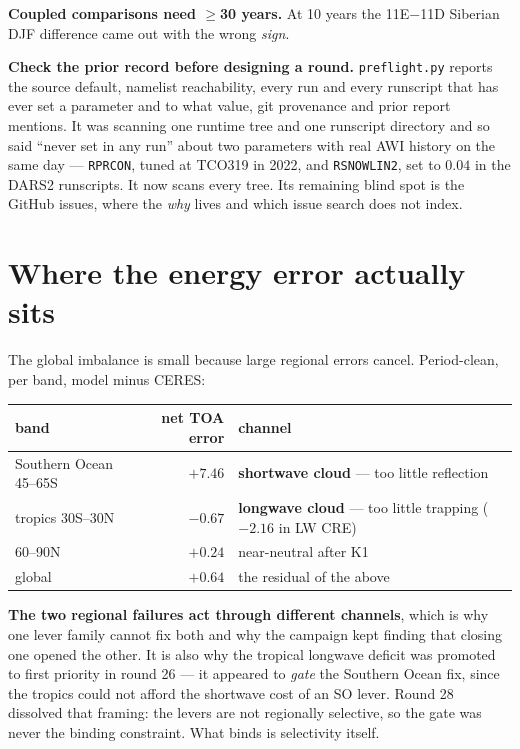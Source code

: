 \documentclass[10pt]{article}
\begin{document}
\textbf{Coupled comparisons need $\geq$30 years.} At 10 years the 11E$-$11D Siberian DJF
difference came out with the wrong \emph{sign}.

\textbf{Check the prior record before designing a round.} \texttt{preflight.py} reports the
source default, namelist reachability, every run and every runscript that has ever set a
parameter and to what value, git provenance and prior report mentions. It was scanning one
runtime tree and one runscript directory and so said ``never set in any run'' about two
parameters with real AWI history on the same day --- \texttt{RPRCON}, tuned at TCO319 in
2022, and \texttt{RSNOWLIN2}, set to $0.04$ in the DARS2 runscripts. It now scans every
tree. Its remaining blind spot is the GitHub issues, where the \emph{why} lives and which
issue search does not index.

\section{Where the energy error actually sits}\label{sec:decomp}

The global imbalance is small because large regional errors cancel. Period-clean, per band,
model minus CERES:

\begin{center}\footnotesize
\begin{tabular}{l r l}
\toprule
band & net TOA error & channel \\
\midrule
Southern Ocean 45--65S & $+7.46$ & \textbf{shortwave cloud} --- too little reflection \\
tropics 30S--30N & $-0.67$ & \textbf{longwave cloud} --- too little trapping ($-2.16$ in LW CRE) \\
60--90N & $+0.24$ & near-neutral after K1 \\
global & $+0.64$ & the residual of the above \\
\bottomrule
\end{tabular}
\end{center}

\noindent \textbf{The two regional failures act through different channels}, which is why
one lever family cannot fix both and why the campaign kept finding that closing one opened
the other. It is also why the tropical longwave deficit was promoted to first priority in
round 26 --- it appeared to \emph{gate} the Southern Ocean fix, since the tropics could not
afford the shortwave cost of an SO lever. Round 28 dissolved that framing: the levers are
not regionally selective, so the gate was never the binding constraint. What binds is
selectivity itself.
\end{document}
